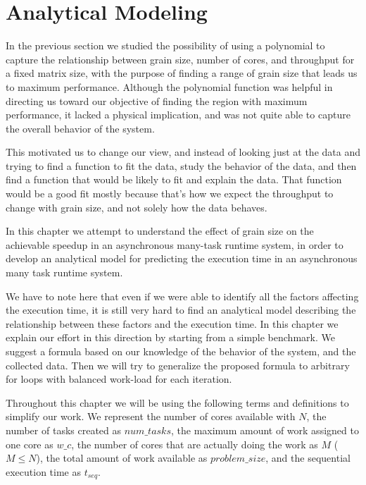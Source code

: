 \section{Analytical Modeling}
In the previous section we studied the possibility of using a polynomial to capture the relationship between grain size, number of cores, and throughput for a fixed matrix size, with the purpose of finding a range of grain size that leads us to maximum performance. 
Although the polynomial function was helpful in directing us toward our objective of finding the region with maximum performance, it lacked a physical implication, and was not quite able to capture the overall behavior of the system. 

This motivated us to change our view, and instead of looking just at the data and trying to find a function to fit the data, study the behavior of the data, and then find a function that would be likely to fit and explain the data. That function would be a good fit mostly because that's how we expect the throughput to change with grain size, and not solely how the data behaves.   

In this chapter we attempt to understand the effect of grain size on the achievable speedup in an asynchronous many-task runtime system, in order to develop an analytical model for predicting the execution time in an asynchronous many task runtime system. 

We have to note here that even if we were able to identify all the factors affecting the execution time, it is still very hard to find an analytical model describing the relationship between these factors and the execution time. In this chapter we explain our effort in this direction by starting from a simple benchmark. We suggest a formula based on our knowledge of the behavior of the system, and the collected data. Then we will try to generalize the proposed formula to arbitrary for loops with balanced work-load for each iteration. 


Throughout this chapter we will be using the following terms and definitions to simplify our work. We represent the number of cores available with $N$, the number of tasks created as $num\_{tasks}$, the maximum amount of work assigned to one core as $w\_c$, the number of cores that are actually doing the work as $M$ ($M\leq{N}$), the total amount of work available as $problem\_{size}$, and the sequential execution time as $t_{seq}$.

